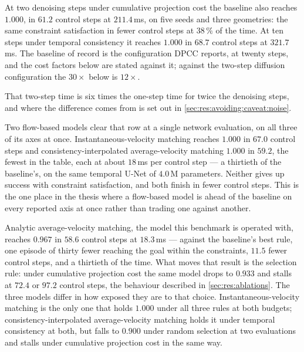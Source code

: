 At two denoising steps under cumulative projection cost the baseline also reaches $1.000$, in $61.2$
control steps at $211.4$\,ms, on five seeds and three geometries: the same constraint satisfaction in
fewer control steps at $38\,\%$ of the time. At ten steps under temporal consistency it reaches $1.000$
in $68.7$ control steps at $321.7$\,ms. The baseline of record is
the configuration \ac{DPCC} reports, at twenty steps, and the cost factors below are stated against it;
against the two-step diffusion configuration the $30\times$ below is $12\times$.

That two-step time is six times the one-step time for twice the denoising steps, and where the
difference comes from is set out in \autoref{sec:res:avoiding:caveat:noise}.

Two flow-based models clear that row at a single network evaluation, on all three of its axes at once.
Instantaneous-velocity matching reaches $1.000$ in $67.0$ control steps and consistency-interpolated
average-velocity matching $1.000$ in $59.2$, the fewest in the table, each at about $18$\,ms per control
step --- a thirtieth of the baseline's, on the same temporal U-Net of $4.0$\,M parameters. Neither gives
up success with constraint satisfaction, and both finish in fewer control steps. This is the one place
in the thesis where a flow-based model is ahead of the baseline on every reported axis at once rather
than trading one against another.

Analytic average-velocity matching, the model this benchmark is operated with, reaches $0.967$ in $58.6$
control steps at $18.3$\,ms --- against the baseline's best rule, one episode of thirty fewer reaching
the goal within the constraints, $11.5$ fewer control steps, and a thirtieth of the time. What moves that
result is the selection rule: under cumulative projection cost the same model drops to $0.933$ and stalls
at $72.4$ or $97.2$ control steps, the
behaviour described in \autoref{sec:res:ablations}. The three models differ in how exposed they are to
that choice. Instantaneous-velocity matching is the only one that holds $1.000$ under all three rules at
both budgets; consistency-interpolated average-velocity matching holds it under temporal consistency at
both, but falls to $0.900$ under random selection at two evaluations and stalls under cumulative
projection cost in the same way.

